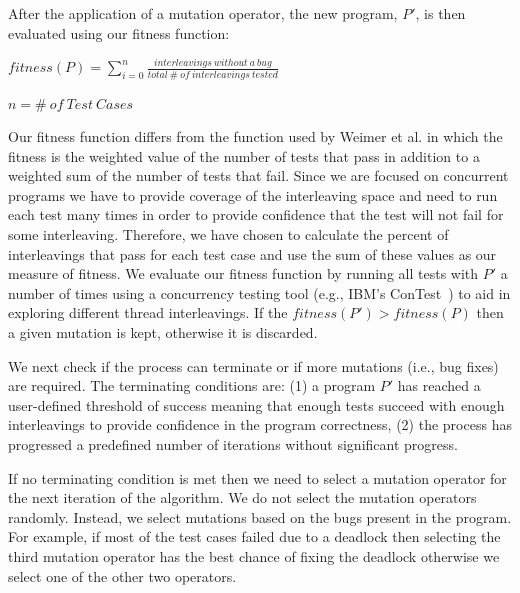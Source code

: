 \documentclass[10pt, conference, compsocconf]{IEEEtran}
\newcommand{\notesbox}[1]{
      \noindent\begin{center}\begin{boxedminipage}[h]{0.4\textwidth}{#1}\end{boxedminipage}\end{center}
}
\begin{document}
\begin{enumerate}
\end{enumerate}

After the application of a mutation operator, the new program, $P'$, is then evaluated using our fitness function:

\begin{footnotesize}
\begin{center}
$fitness(P) = \displaystyle\sum\limits_{i=0}^n\frac{interleavings\ without\ a\ bug}{total\ \#\ of\ interleavings\ tested}$
\end{center}
\end{footnotesize}
\begin{tiny}
\begin{center}
$n = \#\ of\ Test\ Cases$
\end{center}
\end{tiny}

Our fitness function differs from the function used by Weimer et al. in which the fitness is the weighted value of the number of tests that pass in addition to a weighted sum of the number of tests that fail. Since we are focused on concurrent programs we have to provide coverage of the interleaving space and need to run each test many times in order to provide confidence that the test will not fail for some interleaving. Therefore, we have chosen to calculate the percent of interleavings that pass for each test case and use the sum of these values as our measure of fitness. We evaluate our fitness function by running all tests with $P'$ a number of times using a concurrency testing tool (e.g., IBM's ConTest~\cite{EFN+02}) to aid in exploring different thread interleavings.  If the $fitness(P') > fitness(P)$ then a given mutation is kept, otherwise it is discarded.%


We next check if the process can terminate or if more mutations (i.e., bug fixes) are required. The terminating conditions are: (1) a program $P'$ has reached a user-defined threshold of success meaning that enough tests succeed with enough interleavings to provide confidence in the program correctness, (2) the process has progressed a predefined number of iterations without significant progress.

If no terminating condition is met then we need to select a mutation operator for the next iteration of the algorithm. We do not select the mutation operators randomly. Instead, we select mutations based on the bugs present in the program. For example, if most of the test cases failed due to a deadlock then selecting the third mutation operator has the best chance of fixing the deadlock otherwise we select one of the other two operators.
\end{document}
